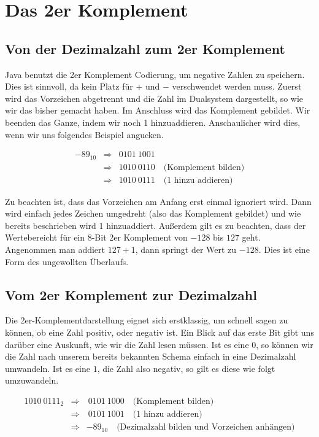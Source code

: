 \section{Das 2er Komplement}

\subsection{Von der Dezimalzahl zum 2er Komplement}

Java benutzt die 2er Komplement Codierung, um negative Zahlen zu speichern. Dies ist sinnvoll, da kein Platz für $+$ und $-$ verschwendet werden muss. Zuerst wird das Vorzeichen abgetrennt und die Zahl im Dualsystem dargestellt, so wie wir das bisher gemacht haben. Im Anschluss wird das Komplement gebildet. Wir beenden das Ganze, indem wir noch 1 hinzuaddieren. Anschaulicher wird dies, wenn wir uns folgendes Beispiel angucken.

\begin{eqnarray} \label{2er Komplement bilden}
-89_{10} & \Rightarrow & 0101\ 1001 \\
& \Rightarrow & 1010\ 0110 \quad\text{(Komplement bilden)}\\
& \Rightarrow & 1010\ 0111 \quad\text{(1 hinzu addieren)}
\end{eqnarray}

Zu beachten ist, dass das Vorzeichen am Anfang erst einmal ignoriert wird. Dann wird einfach jedes Zeichen umgedreht (also das Komplement gebildet) und wie bereits beschrieben wird 1 hinzuaddiert. Außerdem gilt es zu beachten, dass der Wertebereicht für ein 8-Bit 2er Komplement von $-128$ bis $127$ geht. Angenommen man addiert $127 + 1$, dann springt der Wert zu $-128$. Dies ist eine Form des ungewollten Überlaufs.

\subsection{Vom 2er Komplement zur Dezimalzahl}

Die 2er-Komplementdarstellung eignet sich erstklassig, um schnell sagen zu können, ob eine Zahl positiv, oder negativ ist. Ein Blick auf das erste Bit gibt uns darüber eine Auskunft, wie wir die Zahl lesen müssen. Ist es eine $0$, so können wir die Zahl nach unserem bereits bekannten Schema einfach in eine Dezimalzahl umwandeln. Ist es eine $1$, die Zahl also negativ, so gilt es diese wie folgt umzuwandeln.  

\begin{eqnarray}
1010\ 0111_{2} & \Rightarrow & \ 0101\ 1000 \quad\text{(Komplement bilden)}\\
& \Rightarrow & \ 0101\ 1001 \quad\text{(1 hinzu addieren)}\\
& \Rightarrow & -89_{10} \quad\text{(Dezimalzahl bilden und Vorzeichen anhängen)}
\end{eqnarray}


